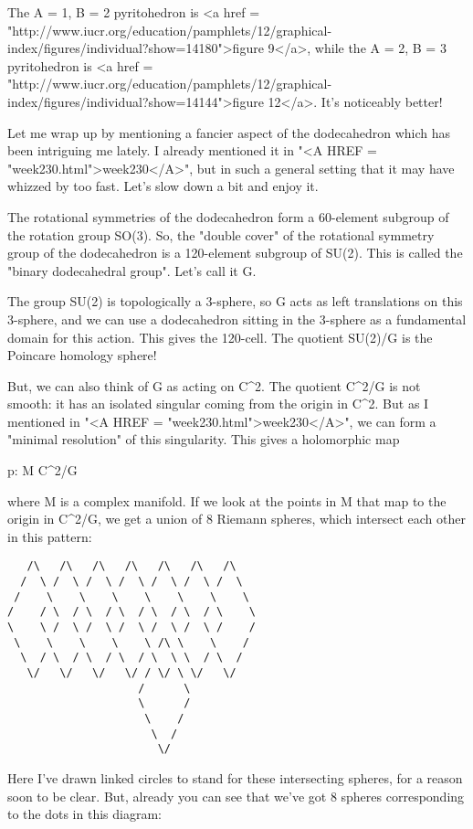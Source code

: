 The A = 1, B = 2 pyritohedron is <a href = "http://www.iucr.org/education/pamphlets/12/graphical-index/figures/individual?show=14180">figure 9</a>, while the A = 2, B = 3
pyritohedron is <a href = "http://www.iucr.org/education/pamphlets/12/graphical-index/figures/individual?show=14144">figure 12</a>.  It's noticeably better!

Let me wrap up by mentioning a fancier aspect of the dodecahedron
which has been intriguing me lately.  I already mentioned it in "<A
HREF = "week230.html">week230</A>", but in such a general setting
that it may have whizzed by too fast.  Let's slow down a bit and enjoy
it.

The rotational symmetries of the dodecahedron form a 60-element 
subgroup of the rotation group SO(3).  So, the "double cover" of 
the rotational symmetry group of the dodecahedron is a 120-element 
subgroup of SU(2).  This is called the "binary dodecahedral group".
Let's call it G.  

The group SU(2) is topologically a 3-sphere, so G acts as left 
translations on this 3-sphere, and we can use a dodecahedron sitting 
in the 3-sphere as a fundamental domain for this action.  This gives 
the 120-cell.  The quotient SU(2)/G is the Poincare homology sphere!  

But, we can also think of G as acting on C^{2}.  The quotient C^{2}/G
is not smooth: it has an isolated singular coming from the origin 
in C^{2}.  But as I mentioned in "<A HREF = "week230.html">week230</A>", we can form a "minimal 
resolution" of this singularity.  This gives a holomorphic map

p: M \to  C^{2}/G 

where M is a complex manifold.   If we look at the points in M
that map to the origin in C^{2}/G, we get a union of 8 Riemann spheres, 
which intersect each other in this pattern:

\begin{verbatim}
   /\   /\   /\   /\   /\   /\   /\ 
  /  \ /  \ /  \ /  \ /  \ /  \ /  \
 /    \    \    \    \    \    \    \
/    / \  / \  / \  / \  / \  / \    \ 
\    \ /  \ /  \ /  \ /  \ /  \ /    / 
 \    \    \    \    \ /\ \    \    /
  \  / \  / \  / \  / \  \ \  / \  /
   \/   \/   \/   \/ / \/ \ \/   \/
                    /      \ 
                    \      /
                     \    /
                      \  /
                       \/ 
\end{verbatim}
    
Here I've drawn linked circles to stand for these intersecting 
spheres, for a reason soon to be clear.  But, already you can 
see that we've got 8 spheres corresponding to the dots in this
diagram:


